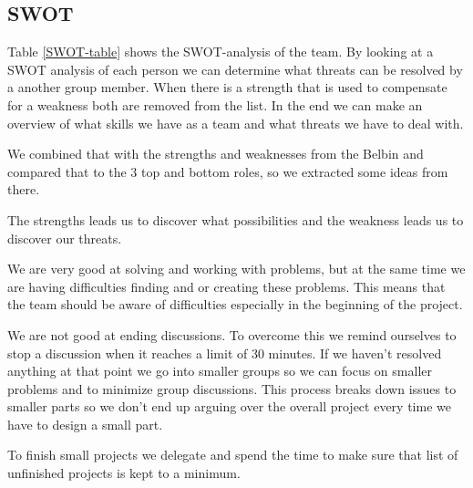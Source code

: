 \subsection{SWOT}

Table \ref{SWOT-table} shows the SWOT-analysis of the team. 
By looking at a SWOT analysis of each person we can determine what threats can be resolved by a another group member.
When there is a strength that is used to compensate for a weakness both are removed from the list. 
In the end we can make an overview of what skills we have as a team and what threats we have to deal with.

We combined that with the strengths and weaknesses from the Belbin and compared that to the 3 top and bottom roles, so we extracted some ideas from there.

The strengths leads us to discover what possibilities and the weakness leads us to discover our threats. 

We are very good at solving and working with problems, but at the same time we are having difficulties finding and or creating these problems. 
This means that the team should be aware of difficulties especially in the beginning of the project.

We are not good at ending discussions.
To overcome this we remind ourselves to stop a discussion when it reaches a limit of 30 minutes.
If we haven't resolved anything at that point we go into smaller groups so we can focus on smaller problems and to minimize group discussions.
This process breaks down issues to smaller parts so we don't end up arguing over the overall project every time we have to design a small part.

To finish small projects we delegate and spend the time to make sure that list of unfinished projects is kept to a minimum. 

